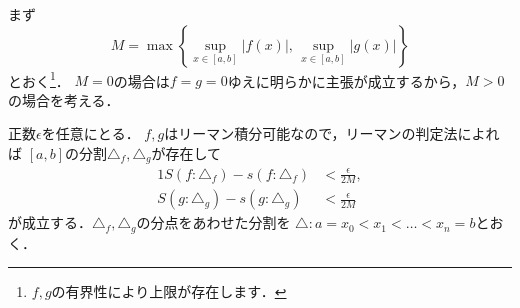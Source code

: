 \documentclass{jsarticle}
\makeatletter
\renewenvironment{proof}[1][\proofname]{\par
        \pushQED{\qed}
        \normalfont
        \topsep6\p@\@plus6\p@ \trivlist
        \item[\hskip\labelsep{\bfseries #1}\@addpunct{\bfseries}]\ignorespaces
    }{%
        \popQED\endtrivlist\@endpefalse
    }
\renewcommand{\proofname}{\underline{証明.}}
\makeatother
\begin{document}
\begin{proof}
    まず
    \begin{equation}
        M = \max \left\{ \sup_{x \in [a,b]} |f(x)|,\, \sup_{x \in [a,b]} |g(x)| \right\}
    \end{equation}
    とおく\footnote{$f, g$の有界性により上限が存在します．}．
    $M = 0$の場合は$f = g = 0$ゆえに明らかに主張が成立するから，$M > 0$の場合を考える．

    正数$\epsilon$を任意にとる．
    $f, g$はリーマン積分可能なので，リーマンの判定法によれば
    $[a,b]$の分割$\triangle_f, \triangle_g$が存在して
    \begin{alignat}{1}
        S(f: \triangle_f) - s(f: \triangle_f) &< \frac{\epsilon}{2M}, \\
        S(g: \triangle_g) - s(g: \triangle_g) &< \frac{\epsilon}{2M}
    \end{alignat}
    が成立する．$\triangle_f, \triangle_g$の分点をあわせた分割を
    $\triangle: a = x_0 < x_1 < \dots < x_n = b$とおく．


\end{proof}
\end{document}
